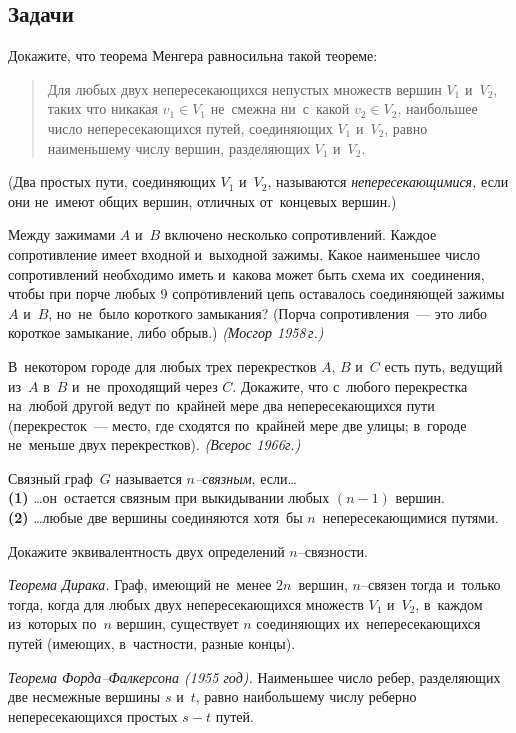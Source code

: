 \subsection*{Задачи}

\begin{problems}

\item
Докажите, что теорема Менгера равносильна такой теореме:
\begin{quote}
Для любых двух непересекающихся непустых множеств вершин $V_1$ и~$V_2$, таких
что никакая $v_1 \in V_1$ не~смежна ни~с~какой $v_2 \in V_2$, наибольшее число
непересекающихся путей, соединяющих $V_1$ и~$V_2$, равно наименьшему числу
вершин, разделяющих $V_1$ и~$V_2$.
\end{quote}
(Два простых пути, соединяющих $V_1$ и~$V_2$, называются
\emph{непересекающимися,} если они не~имеют общих вершин, отличных от~концевых
вершин.)

\item
Между зажимами $A$ и~$B$ включено несколько сопротивлений.
Каждое сопротивление имеет входной и~выходной зажимы.
Какое наименьшее число сопротивлений необходимо иметь и~какова может быть схема
их~соединения, чтобы при порче любых $9$ сопротивлений цепь оставалось
соединяющей зажимы $A$ и~$B$, но~не~было короткого замыкания?
(Порча сопротивления~--- это либо короткое замыкание, либо обрыв.)
\emph{(Мосгор 1958\,г.)}

\item
В~некотором городе для любых трех перекрестков $A$, $B$ и~$C$ есть путь,
ведущий из~$A$ в~$B$ и~не~проходящий через $C$.
Докажите, что с~любого перекрестка на~любой другой ведут по~крайней мере два
непересекающихся пути (перекресток~--- место, где сходятся по~крайней мере две
улицы; в~городе не~меньше двух перекрестков).
\emph{(Всерос 1966г.)}

\end{problems}

Связный граф~$G$ называется \emph{$n$--связным}, если\ldots
\\
\textbf{(1)}
\ldots он~остается связным при выкидывании любых $(n - 1)$ вершин.
\\
\textbf{(2)}
\ldots любые две вершины соединяются хотя~бы $n$~непересекающимися путями.

\begin{problems}

\item
Докажите эквивалентность двух определений $n$--связности.

\item\emph{Теорема Дирака.}
Граф, имеющий не~менее $2 n$~вершин, $n$--связен тогда и~только тогда, когда
для любых двух непересекающихся множеств $V_1$ и~$V_2$, в~каждом из~которых
по~$n$ вершин, существует $n$ соединяющих их~непересекающихся путей (имеющих,
в~частности, разные концы).

\item\emph{Теорема Форда--Фалкерсона (1955 год).}
Наименьшее число ребер, разделяющих две не\-смеж\-ные вершины $s$ и~$t$, равно
наибольшему числу реберно непересекающихся простых $s {-} t$ путей.

\end{problems}


